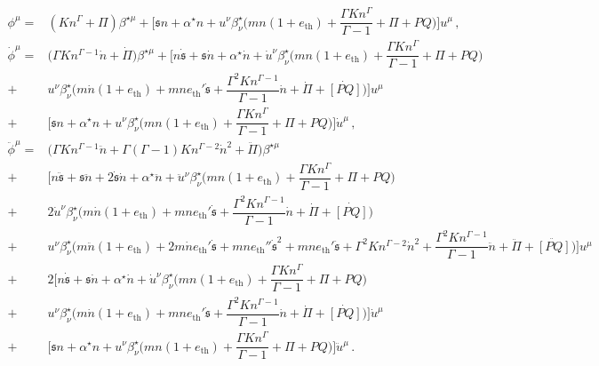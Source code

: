 \documentclass[a4paper, amsfonts, amssymb, amsmath, reprint, showkeys, nofootinbib, twoside,notitlepage,onecolumn]{revtex4-2}
\newcommand{\s}{{\mathfrak{s}}}
\theoremstyle{definition}
\theoremstyle{theorem}
\theoremstyle{corollary}
\begin{document}
\begin{equation}
\begin{split}
\phi^\mu ={}& (K n^\Gamma{+}\Pi)\beta^{\star \mu} +\bigg[\s n +\alpha^\star n +u^\nu \beta^\star_\nu \bigg( mn(1{+}e_\text{th})+\dfrac{\Gamma Kn^\Gamma}{\Gamma{-}1} +\Pi +PQ    \bigg) \bigg] u^\mu \, ,\\
\dot{\phi}^\mu ={}& \big(\Gamma K n^{\Gamma-1}\dot{n}{+}\dot{\Pi}\big)\beta^{\star \mu} +\bigg[ n \dot{\s}+\s \dot{n} +\alpha^\star \dot{n} +\dot{u}^\nu \beta^\star_\nu \bigg( mn(1{+}e_\text{th})+\dfrac{\Gamma Kn^\Gamma}{\Gamma{-}1} +\Pi +PQ    \bigg) \\
+{}& u^\nu \beta^\star_\nu \bigg( m\dot{n}(1{+}e_\text{th})+mne_\text{th}'\dot{\s}+\dfrac{\Gamma^2 Kn^{\Gamma-1}}{\Gamma{-}1} \dot{n}+\dot{\Pi} +\dot{[PQ]}    \bigg) \bigg] u^\mu \\ 
+{}& \bigg[\s n +\alpha^\star n +u^\nu \beta^\star_\nu \bigg( mn(1{+}e_\text{th})+\dfrac{\Gamma K n^\Gamma}{\Gamma{-}1} +\Pi +PQ    \bigg) \bigg] \dot{u}^\mu \, ,\\
\ddot{\phi}^\mu ={}& \big(\Gamma K n^{\Gamma-1}\ddot{n}{+}\Gamma(\Gamma{-}1)Kn^{\Gamma-2}\dot{n}^2{+}\ddot{\Pi}\big)\beta^{\star \mu}\\+{}& \bigg[ n \ddot{\s}+\s \ddot{n}+2\dot{\s}\dot{n} +\alpha^\star \ddot{n} +\ddot{u}^\nu \beta^\star_\nu \bigg( mn(1{+}e_\text{th})+\dfrac{\Gamma Kn^\Gamma}{\Gamma{-}1} +\Pi +PQ    \bigg) \\
+{}& 2\dot{u}^\nu \beta^\star_\nu \bigg( m\dot{n}(1{+}e_\text{th})+mne_\text{th}'\dot{\s}+\dfrac{\Gamma^2 Kn^{\Gamma-1}}{\Gamma{-}1} \dot{n}+\dot{\Pi} +\dot{[PQ]}    \bigg)\\
+{}& u^\nu \beta^\star_\nu \bigg( m\ddot{n}(1{+}e_\text{th})+2m\dot{n}e_\text{th}'\dot{\s}+mne_\text{th}''\dot{\s}^2+mne_\text{th}'\ddot{\s}+\Gamma^2 Kn^{\Gamma-2} \dot{n}^2+\dfrac{\Gamma^2 Kn^{\Gamma-1}}{\Gamma{-}1} \ddot{n}+\ddot{\Pi} +\ddot{[PQ]}    \bigg) \bigg] u^\mu  \\+{}& 2\bigg[ n \dot{\s}+\s \dot{n} +\alpha^\star \dot{n} +\dot{u}^\nu \beta^\star_\nu \bigg( mn(1{+}e_\text{th})+\dfrac{\Gamma Kn^\Gamma}{\Gamma{-}1} +\Pi +PQ    \bigg) \\
+{}& u^\nu \beta^\star_\nu \bigg( m\dot{n}(1{+}e_\text{th})+mne_\text{th}'\dot{\s}+\dfrac{\Gamma^2 Kn^{\Gamma-1}}{\Gamma{-}1} \dot{n}+\dot{\Pi} +\dot{[PQ]}    \bigg) \bigg] \dot{u}^\mu \\ 
+{}& \bigg[\s n +\alpha^\star n +u^\nu \beta^\star_\nu \bigg( mn(1{+}e_\text{th})+\dfrac{\Gamma K n^\Gamma}{\Gamma{-}1} +\Pi +PQ    \bigg) \bigg] \ddot{u}^\mu \, .\\
\end{split}
\end{equation}
\end{document}
